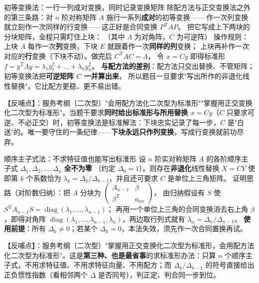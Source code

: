 \begin{fdeep}{初等变换法：一行一列成对变换，同时记录变换矩阵}
除配方法与正交变换法之外的第三条路：对 $n$ 阶对称矩阵 $A$ 施行一系列\textbf{成对}的初等变换
——作一次列变换就立刻作一次同样的行变换——这正好是合同变换 $P^{\mathrm T}AP$。
把它写成上下两块的分块矩阵，全程只需盯住上块：
（其中 $\Lambda$ 为对角阵，$C$ 为可逆阵）
操作规则：上块 $A$ 每作一次\textbf{列}变换，下块 $E$ 就跟着作一次\textbf{同样的列}变换；
上块再补作一次对应的\textbf{行}变换（下块不动）。做完后 $C^{\mathrm T}AC=\Lambda$，
令 $x=Cy$ 即得标准形 $f=y^{\mathrm T}\Lambda y=\lambda_1y_1^{2}+\dots+\lambda_ny_n^{2}$。
\textbf{与配方法的差别}：配方法只交出替换、不管矩阵；初等变换法把\textbf{可逆矩阵 $C$ 一并算出来}，
所以题目一旦要求"写出所作的非退化线性替换"，它比配方更稳、更不易出错。

【反哺点】：服务考纲〔二次型〕"会用配方法化二次型为标准形""掌握用正交变换化二次型为标准形"。当题干要求\textbf{同时给出标准形与所用替换 $x=Cy$}（$C$ 只要求可逆、不必正交）时，初等变换法是标准解法：下块忠实记录了每一步，$C$ 是"白送"的。唯一要守住的一条纪律——\textbf{下块永远只作列变换}，写成行变换就前功尽弃。
\end{fdeep}

\begin{fdeep}{顺序主子式法：不求特征值也能写出标准形}
设 $n$ 阶实对称矩阵 $A$ 的各阶顺序主子式 $\Delta_1,\Delta_2,\dots,\Delta_n$ \textbf{全不为零}
（约定 $\Delta_0=1$）。则存在\textbf{非退化}线性替换 $X=CY$ 使
即第 $k$ 个系数恰为 $\lambda_k=\Delta_k/\Delta_{k-1}$，并且还可要求 $C$ 是单位上三角矩阵。
证明思路（对阶数归纳）：把 $A$ 分块为 $\begin{pmatrix}A_{n-1}&\beta\\ \beta^{\mathrm T}&a_{nn}\end{pmatrix}$，
由归纳假设有 $S$ 使 $S^{\mathrm T}A_{n-1}S=\operatorname{diag}(\lambda_1,\dots,\lambda_{n-1})$；
再用一个单位上三角的合同变换消去右上角 $\beta$，即得对角阵
$\operatorname{diag}(\lambda_1,\dots,\lambda_{n-1},\lambda_n)$，两边取行列式就有
$\lambda_n=\Delta_n/\Delta_{n-1}$。
\textbf{使用前提}：所有 $\Delta_k\ne0$；若某个 $\Delta_k=0$，本法失效，须先作一次合同置换再试。

【反哺点】：服务考纲〔二次型〕"掌握用正交变换化二次型为标准形，会用配方法化二次型为标准形"。这是\textbf{第三种、也是最省事}的求标准形办法：只算 $n$ 个顺序主子式，不用求特征值、不用求特征向量、不用配方；而 $\Delta_k/\Delta_{k-1}$ 的符号直接给出正负惯性指数（看相邻两个 $\Delta$ 是否同号），判正定、判合同一步到位。
\end{fdeep}

